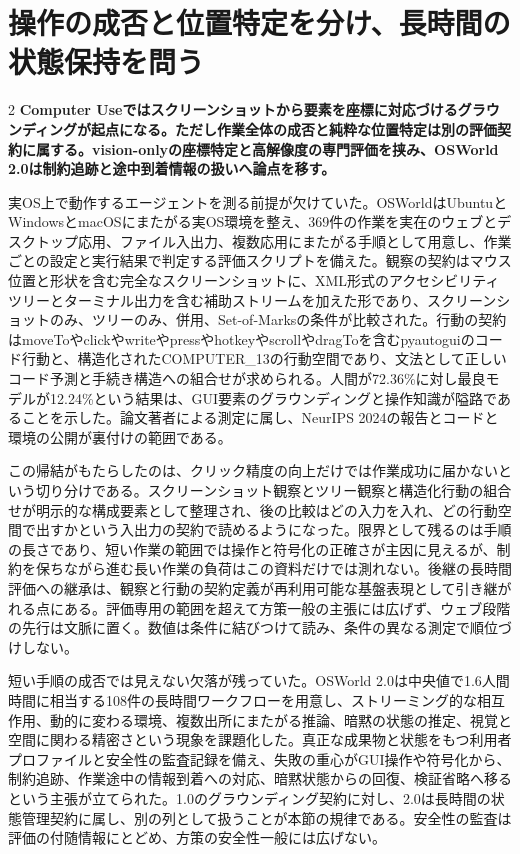 \documentclass[lualatex,a4paper,10pt]{jlreq}
\begin{document}
\section{操作の成否と位置特定を分け、長時間の状態保持を問う}
\label{sec:p12}
\begin{multicols}{2}
\raggedcolumns
\noindent\textbf{Computer Useではスクリーンショットから要素を座標に対応づけるグラウンディングが起点になる。ただし作業全体の成否と純粋な位置特定は別の評価契約に属する。vision-onlyの座標特定と高解像度の専門評価を挟み、OSWorld 2.0は制約追跡と途中到着情報の扱いへ論点を移す。}\autocite{vmd090,vmd091}\par\medskip
\noindent 実OS上で動作するエージェントを測る前提が欠けていた。OSWorldはUbuntuとWindowsとmacOSにまたがる実OS環境を整え、369件の作業を実在のウェブとデスクトップ応用、ファイル入出力、複数応用にまたがる手順として用意し、作業ごとの設定と実行結果で判定する評価スクリプトを備えた。観察の契約はマウス位置と形状を含む完全なスクリーンショットに、XML形式のアクセシビリティツリーとターミナル出力を含む補助ストリームを加えた形であり、スクリーンショットのみ、ツリーのみ、併用、Set-of-Marksの条件が比較された。行動の契約はmoveToやclickやwriteやpressやhotkeyやscrollやdragToを含むpyautoguiのコード行動と、構造化されたCOMPUTER\_13の行動空間であり、文法として正しいコード予測と手続き構造への組合せが求められる。人間が72.36\%に対し最良モデルが12.24\%という結果は、GUI要素のグラウンディングと操作知識が隘路であることを示した。論文著者による測定に属し、NeurIPS 2024の報告とコードと環境の公開が裏付けの範囲である。\autocite{vmd090}\par\medskip
\noindent この帰結がもたらしたのは、クリック精度の向上だけでは作業成功に届かないという切り分けである。スクリーンショット観察とツリー観察と構造化行動の組合せが明示的な構成要素として整理され、後の比較はどの入力を入れ、どの行動空間で出すかという入出力の契約で読めるようになった。限界として残るのは手順の長さであり、短い作業の範囲では操作と符号化の正確さが主因に見えるが、制約を保ちながら進む長い作業の負荷はこの資料だけでは測れない。後継の長時間評価への継承は、観察と行動の契約定義が再利用可能な基盤表現として引き継がれる点にある。評価専用の範囲を超えて方策一般の主張には広げず、ウェブ段階の先行は文脈に置く。数値は条件に結びつけて読み、条件の異なる測定で順位づけしない。\autocite{vmd090}\par\medskip
\noindent 短い手順の成否では見えない欠落が残っていた。OSWorld 2.0は中央値で1.6人間時間に相当する108件の長時間ワークフローを用意し、ストリーミング的な相互作用、動的に変わる環境、複数出所にまたがる推論、暗黙の状態の推定、視覚と空間に関わる精密さという現象を課題化した。真正な成果物と状態をもつ利用者プロファイルと安全性の監査記録を備え、失敗の重心がGUI操作や符号化から、制約追跡、作業途中の情報到着への対応、暗黙状態からの回復、検証省略へ移るという主張が立てられた。1.0のグラウンディング契約に対し、2.0は長時間の状態管理契約に属し、別の列として扱うことが本節の規律である。安全性の監査は評価の付随情報にとどめ、方策の安全性一般には広げない。\autocite{vmd091}\par\medskip

\end{multicols}
\end{document}
